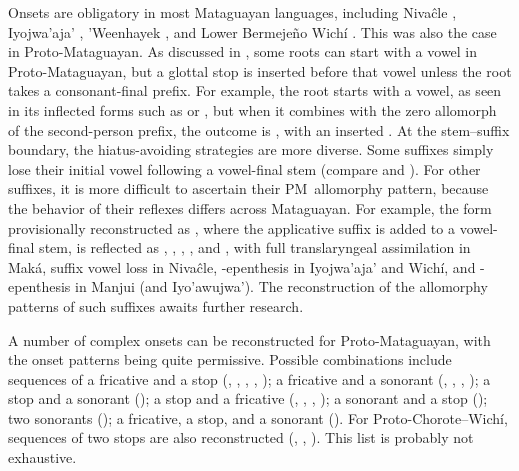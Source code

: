 Onsets are obligatory in most Mataguayan languages, including Nivaĉle \citep[5]{AnG16}, Iyojwa’aja’ \citep[90]{JC14b}, ’Weenhayek \citep[3]{KC94}, and Lower Bermejeño Wichí \citep[97]{VN14}. This was also the case in Proto-Mataguayan. As discussed in , some roots can start with a vowel in Proto-Mataguayan, but a glottal stop is inserted before that vowel unless the root takes a consonant-final prefix. For example, the root  starts with a vowel, as seen in its inflected forms such as  or , but when it combines with the zero allomorph of the second-person prefix, the outcome is , with an inserted . At the stem--suffix boundary, the hiatus-avoiding strategies are more diverse. Some suffixes simply lose their initial vowel following a vowel-final stem (compare  and ). For other suffixes, it is more difficult to ascertain their PM~allomorphy pattern, because the behavior of their reflexes differs across Mataguayan. For example, the form provisionally reconstructed as , where the applicative suffix is added to a vowel-final stem, is reflected as , , , , and , with full translaryngeal assimilation in Maká, suffix vowel loss in Nivaĉle, \mbox{-}epenthesis in Iyojwa'aja' and Wichí, and \mbox{-}epenthesis in Manjui (and Iyo'awujwa'). The reconstruction of the allomorphy patterns of such suffixes awaits further research.

A number of complex onsets can be reconstructed for Proto-Mataguayan, with the onset patterns being quite permissive. Possible combinations include sequences of a fricative and a stop (, , , , ); a fricative and a sonorant (, , , ); a stop and a sonorant (); a stop and a fricative (, , , ); a sonorant and a stop (); two sonorants (); a fricative, a stop, and a sonorant (). For Proto-Chorote–Wichí, sequences of two stops are also reconstructed (, , ). This list is probably not exhaustive.

